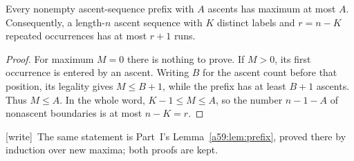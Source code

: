 \documentclass[11pt,letterpaper]{article}
\theoremstyle{remark}\newtheorem{remark}[theorem]{Remark}
\newcommand{\wtag}{\textup{[write]}}
\theoremstyle{remark}\newtheorem{wremark}{Remark}\renewcommand{\thewremark}{W\arabic{wremark}}
\theoremstyle{plain}\newtheorem{wcorollary}[wremark]{Corollary}
\begin{document}
\begin{lemma}\label{a59:g:lem:prefix-max}
Every nonempty ascent-sequence prefix with $A$ ascents has maximum at most $A$. Consequently, a length-$n$ ascent sequence with $K$ distinct labels and $r=n-K$ repeated occurrences has at most $r+1$ runs.
\end{lemma}
\begin{proof}
For maximum $M=0$ there is nothing to prove. If $M>0$, its first occurrence is entered by an ascent. Writing $B$ for the ascent count before that position, its legality gives $M\leq B+1$, while the prefix has at least $B+1$ ascents. Thus $M\leq A$. In the whole word, $K-1\leq M\leq A$, so the number $n-1-A$ of nonascent boundaries is at most $n-K=r$.
\end{proof}
\noindent\wtag\ The same statement is Part~I's Lemma~\ref{a59:lem:prefix},
proved there by induction over new maxima; both proofs are kept.
\end{document}
